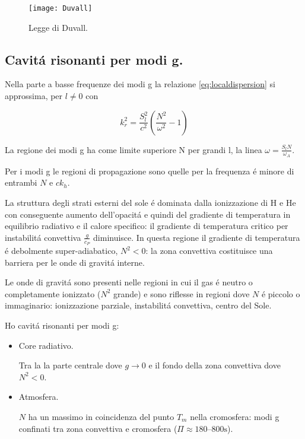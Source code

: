 \documentclass[oneside,12pt,fleqn]{memoir}
\begin{document}
{\begin{figure}[!ht]
\centering
\texttt{[image: Duvall]}
\caption{Legge di Duvall.}
\end{figure}

\clearpage

\subsection{Cavit\'a risonanti per modi g.}

Nella parte a basse frequenze dei modi g la relazione \ref{eq:localdispersion} si approssima, per $l\neq0$ con

\begin{equation*}
k_r^2=\frac{S_l^2}{c^2}(\frac{N^2}{\omega^2}-1)
\end{equation*}

La regione dei modi g ha come limite superiore N per grandi l, la linea $\omega=\frac{S_lN}{\omega_A}$.

Per i modi g le regioni di propagazione sono quelle per la frequenza \'e minore di entrambi $N$ e $ck_h$.

La struttura degli strati esterni del sole \'e dominata dalla ionizzazione di H e He con conseguente aumento dell'opacit\'a e quindi del gradiente di temperatura in equilibrio radiativo e il calore specifico: il gradiente di temperatura critico per instabilit\'a convettiva $\frac{g}{c_P}$ diminuisce. In questa regione il gradiente di temperatura \'e debolmente super-adiabatico, $N^2<0$: la zona convettiva costituisce una barriera per le onde di gravit\'a interne.

Le onde di gravit\'a sono presenti nelle regioni in cui il gas \'e neutro o completamente ionizzato ($N^2$ grande) e sono riflesse in regioni dove $N$ \'e piccolo o immaginario: ionizzazione parziale, instabilit\'a convettiva, centro del Sole.

Ho cavit\'a risonanti per modi g:
\begin{itemize}
    \item Core radiativo.
    
    Tra la la parte centrale dove $g\to0$ e il fondo della zona convettiva dove $N^2<0$.
    \item Atmosfera.
    
    $N$ ha un massimo in coincidenza del punto $T_m$ nella cromosfera: modi g confinati tra zona convettiva e cromosfera ($\Pi\approx\numrange{180}{800}\si{\second}$).
\end{itemize}


}
\end{document}
